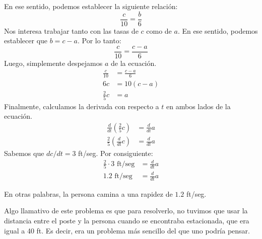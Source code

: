 \documentclass[12pt]{article}
\begin{document}
En ese sentido, podemos establecer la siguiente relación:
\[
	\frac{c}{10} = \frac{b}{6}
\]
Nos interesa trabajar tanto con las tasas de $c$ como de $a$. En ese sentido, podemos establecer que $b = c - a$. Por lo tanto:
\[
	\frac{c}{10} = \frac{c - a}{6}
\]
Luego, simplemente despejamos $a$ de la ecuación.
\begin{align*}
	\frac{c}{10} &= \frac{c - a}{6} \\
	6c &= 10(c - a) \\
	\frac{2}{5}c &= a
\end{align*}
Finalmente, calculamos la derivada con respecto a $t$ en ambos lados de la ecuación.
\begin{align*}
	\frac{d}{dt}\left(\frac{2}{5}c\right) &= \frac{d}{dt}a \\
	\frac{2}{5} \left(\frac{d}{dt} c\right) &= \frac{d}{dt} a
\end{align*}
Sabemos que $dc/dt = 3$ ft/seg. Por consiguiente:
\begin{align*}
	\frac{2}{5} \cdot 3 \text{ ft/seg} &= \frac{d}{dt} a \\
	1.2 \text{ ft/seg} &= \frac{d}{dt} a
\end{align*}

\newpage

En otras palabras, la persona camina a una rapidez de $1.2$ ft/seg.

Algo llamativo de este problema es que para resolverlo, no tuvimos que usar la distancia entre el poste y la persona cuando se encontraba estacionada, que era igual a 40 ft. Es decir, era un problema más sencillo del que uno podría pensar.
\end{document}
